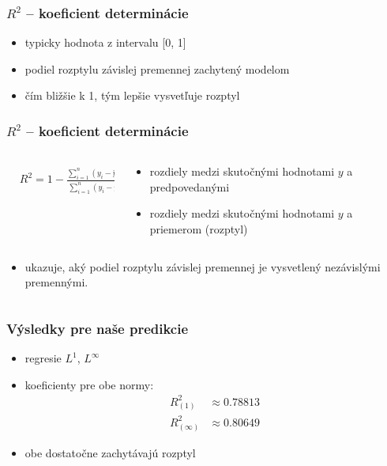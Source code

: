 \documentclass[presentation.tex]{subfiles}
\begin{document}
	
	\begin{frame}
		\frametitle{$R^2$ -- koeficient determinácie }
		\begin{itemize}
			\item typicky hodnota z intervalu [0, 1]
			\item podiel rozptylu závislej premennej zachytený modelom
			\item čím bližšie k 1, tým lepšie vysvetľuje rozptyl
		\end{itemize}
		
		
		

	\end{frame}

	\begin{frame}
		\frametitle{$R^2$ -- koeficient determinácie}
		\begin{columns}
			\begin{column}{0.5\textwidth}
				\centering
				\begin{align*}
						&R^2 = 1 - \frac{\sum_{i=1}^{n} (y_i - \hat{y}_i)^2}{\sum_{i=1}^{n} (y_i - \bar{y})^2}
				\end{align*}
			\end{column}
			\begin{column}{0.5\textwidth}
				\begin{itemize}
					\item rozdiely medzi skutočnými hodnotami $y$ a predpovedanými
					\item  rozdiely medzi skutočnými hodnotami $y$ a priemerom (rozptyl)
				\end{itemize}
				
			\end{column}
		\end{columns}

		\begin{columns}
			\begin{column}{\textwidth}
			\begin{itemize}
				\item ukazuje, aký podiel rozptylu závislej premennej je vysvetlený nezávislými premennými.
			\end{itemize}
			\end{column}
		\end{columns}
	\end{frame}

	\begin{frame}
		\frametitle{Výsledky pre naše predikcie}
				\begin{itemize}
					\item regresie $L^1$, $L^{\infty}$
					\item koeficienty pre obe normy: 
					\begin{align*} 
						R^{2}_{(1)} &\approx  0.78813\\
						R^{2}_{(\infty)} &\approx 0.80649
					\end{align*}
					\item obe dostatočne zachytávajú rozptyl
				\end{itemize}
			
	\end{frame}
	
\end{document}
